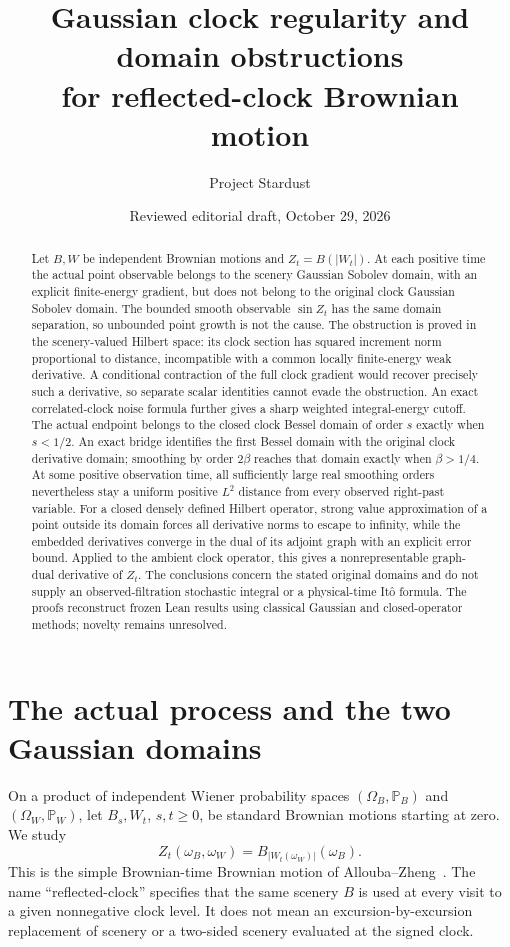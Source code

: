 \documentclass[11pt]{article}
\title{Gaussian clock regularity and domain obstructions\protect\\
for reflected-clock Brownian motion}
\author{Project Stardust}
\date{Reviewed editorial draft, October 29, 2026}
\begin{document}
\maketitle
\begin{abstract}
Let $B,W$ be independent Brownian motions and
$Z_t=B(|W_t|)$. At each positive time the actual point
observable belongs to the scenery Gaussian Sobolev
domain, with an explicit finite-energy gradient, but
does not belong to the original clock Gaussian Sobolev
domain. The bounded smooth observable $\sin Z_t$ has the
same domain separation, so unbounded point growth is not
the cause. The obstruction is proved in the scenery-valued
Hilbert space: its clock section has squared increment
norm proportional to distance, incompatible with a
common locally finite-energy weak derivative. A
conditional contraction of the full clock gradient
would recover precisely such a derivative, so separate
scalar identities cannot evade the obstruction.
An exact correlated-clock noise formula further gives a sharp
weighted integral-energy cutoff. The actual endpoint belongs to the
closed clock Bessel domain of order $s$ exactly when $s<1/2$. An exact
bridge identifies the first Bessel domain with the original clock
derivative domain; smoothing by order $2\beta$ reaches that domain
exactly when $\beta>1/4$. At some positive observation time, all sufficiently
large real smoothing orders nevertheless stay a uniform positive
$L^2$ distance from every observed right-past variable.
For a closed densely defined Hilbert operator, strong
value approximation of a point outside its domain forces
all derivative norms to escape to infinity, while the
embedded derivatives converge in the dual of its
adjoint graph with an explicit error bound. Applied to
the ambient clock operator, this gives a nonrepresentable
graph-dual derivative of $Z_t$. The conclusions concern
the stated original domains and do not supply an
observed-filtration stochastic integral or a physical-time
It\^o formula. The proofs reconstruct frozen Lean results
using classical Gaussian and closed-operator methods;
novelty remains unresolved.
\end{abstract}

\section{The actual process and the two Gaussian domains}
On a product of independent Wiener probability spaces
$(\Omega_B,\mathbb P_B)$ and $(\Omega_W,\mathbb P_W)$,
let $B_s,W_t$, $s,t\geq0$, be standard Brownian motions
starting at zero. We study
\begin{equation}\label{eq:process}
 Z_t(\omega_B,\omega_W)=B_{|W_t(\omega_W)|}(\omega_B).
\end{equation}
This is the simple Brownian-time Brownian motion of
Allouba--Zheng~\cite{alloubazheng}. The name
``reflected-clock'' specifies that the same scenery
$B$ is used at every visit to a given nonnegative
clock level. It does not mean an excursion-by-excursion
replacement of scenery or a two-sided scenery evaluated
at the signed clock.
\end{document}
